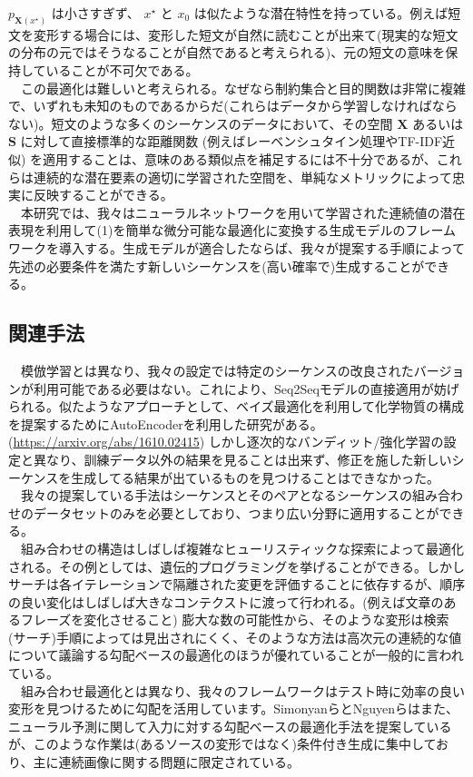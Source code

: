 \documentclass{scrartcl}
\begin{document}
\(p_{\bm{X}(x^{\star})}\) は小さすぎず、 \(x^{\star}\) と \(x_0\) は似たような潜在特性を持っている。例えば短文を変形する場合には、変形した短文が自然に読むことが出来て(現実的な短文の分布の元ではそうなることが自然であると考えられる)、元の短文の意味を保持していることが不可欠である。\\
　この最適化は難しいと考えられる。なぜなら制約集合と目的関数は非常に複雑で、いずれも未知のものであるからだ(これらはデータから学習しなければならない)。短文のような多くのシーケンスのデータにおいて、その空間 \(\bm{X}\) あるいは \(\bm{S}\) に対して直接標準的な距離関数 (例えばレーベンシュタイン処理やTF-IDF近似) を適用することは、意味のある類似点を補足するには不十分であるが、これらは連続的な潜在要素の適切に学習された空間を、単純なメトリックによって忠実に反映することができる。\\
　本研究では、我々はニューラルネットワークを用いて学習された連続値の潜在表現を利用して(1)を簡単な微分可能な最適化に変換する生成モデルのフレームワークを導入する。生成モデルが適合したならば、我々が提案する手順によって先述の必要条件を満たす新しいシーケンスを(高い確率で)生成することができる。\\
\subsection{関連手法}
\label{sec:orga8368cd}
　模倣学習とは異なり、我々の設定では特定のシーケンスの改良されたバージョンが利用可能である必要はない。これにより、Seq2Seqモデルの直接適用が妨げられる。似たようなアプローチとして、ベイズ最適化を利用して化学物質の構成を提案するためにAutoEncoderを利用した研究がある。(\url{https://arxiv.org/abs/1610.02415}) しかし逐次的なバンディット/強化学習の設定と異なり、訓練データ以外の結果を見ることは出来ず、修正を施した新しいシーケンスを生成してる結果が出ているものを見つけることはできなかった。\\
　我々の提案している手法はシーケンスとそのペアとなるシーケンスの組み合わせのデータセットのみを必要としており、つまり広い分野に適用することができる。\\
　組み合わせの構造はしばしば複雑なヒューリスティックな探索によって最適化される。その例としては、遺伝的プログラミングを挙げることができる。しかしサーチは各イテレーションで隔離された変更を評価することに依存するが、順序の良い変化はしばしば大きなコンテクストに渡って行われる。(例えば文章のあるフレーズを変化させること) 膨大な数の可能性から、そのような変形は検索(サーチ)手順によっては見出されにくく、そのような方法は高次元の連続的な値について議論する勾配ベースの最適化のほうが優れていることが一般的に言われている。\\
　組み合わせ最適化とは異なり、我々のフレームワークはテスト時に効率の良い変形を見つけるために勾配を活用しています。SimonyanらとNguyenらはまた、ニューラル予測に関して入力に対する勾配ベースの最適化手法を提案しているが、このような作業は(あるソースの変形ではなく)条件付き生成に集中しており、主に連続画像に関する問題に限定されている。\\
\end{document}

